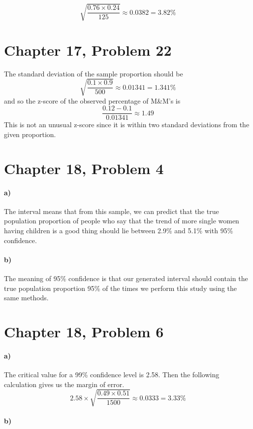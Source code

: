 \documentclass[12pt]{article}
\begin{document}
\[\sqrt{\frac{0.76\times0.24}{125}}\approx 0.0382 = 3.82\%\]

\section*{Chapter 17, Problem 22}

The standard deviation of the sample proportion should be
\[\sqrt{\frac{0.1\times0.9}{500}}\approx 0.01341 = 1.341\%\]
and so the z-score of the observed percentage of M\&M's is
\[\frac{0.12-0.1}{0.01341}\approx 1.49\]
This is not an unusual z-score since it is within two standard deviations from
the given proportion.

\section*{Chapter 18, Problem 4}

\paragraph{a)}

The interval means that from this sample, we can predict that the true population proportion
of people who say that the trend of more single women having children is a good thing should lie
between 2.9\% and 5.1\% with 95\% confidence.

\paragraph{b)}

The meaning of 95\% confidence is that our generated interval should contain the true population
proportion 95\% of the times we perform this study using the same methods.

\section*{Chapter 18, Problem 6}

\paragraph{a)}

The critical value for a 99\% confidence level is 2.58. Then the following calculation gives us
the margin of error.
\[2.58\times\sqrt{\frac{0.49\times0.51}{1500}}\approx0.0333=3.33\%\]

\paragraph{b)}
\end{document}
